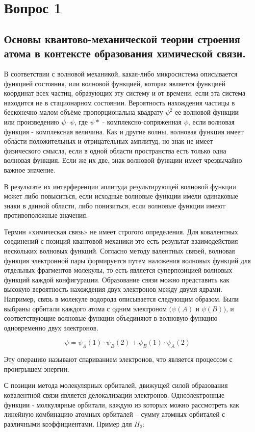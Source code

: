 \documentclass[14pt,a4paper]{scrartcl}
\begin{document}
\section{Вопрос 1}
\subsection{\textbf{Основы квантово-механической теории строения атома в контексте образования химической связи.}}

 В соответствии с волновой механикой, какая-либо микросистема
описывается функцией состояния, или волновой функцией, которая
является функцией координат всех частиц, образующих эту систему
и от времени, если эта система находится не в стационарном
состоянии. Вероятность нахождения частицы в бесконечно малом
объёме пропорциональна квадрату $\psi^2$ ее волновой функции или
произведению $\psi\cdot\psi$, где $\psi*$ - комплексно-сопряженная $\psi$, если
волновая функция - комплексная величина. Как и другие волны,
волновая функция имеет области положительных и отрицательных
амплитуд, но знак не имеет физического смысла, если в одной
области пространства есть только одна волновая функция. Если же
их две, знак волновой функции имеет чрезвычайно важное
значение.

В результате их интерференции аплитуда
результирующей волновой функции может либо повыситься, если
исходные волновые функции имели одинаковые знаки в данной
области, либо понизиться, если волновые функции имеют
противоположные значения.

Термин «химическая связь» не имеет строгого определения. Для
ковалентных соединений с позиций квантовой механики это есть
результат взаимодействия нескольких волновых функций. Согласно
методу валентных связей, волновая функция электронной пары
формируется путем наложения волновых функций для отдельных
фрагментов молекулы, то есть является суперпозицией волновых
функций каждой конфигурации. Образование связи можно
представить как высокую вероятность нахождения двух электронов
между двумя ядрами. Например, связь в молекуле водорода
описывается следующим образом. Были выбраны орбитали
каждого атома с одним электроном $(\psi(A)$ и $\psi(B))$, и
соответствующие волновые функции объединяют в волновую
функцию одновременно двух электронов.

$$\psi = \psi_A(1)\cdot\psi_B(2) + \psi_B(1)\cdot\psi_A(2)$$

Эту операцию называют спариванием электронов, что является процессом с проигрышем энергии.

С позиции метода молекулярных орбиталей, движущей силой образования ковалентной связи является делокализации электронов. Одноэлектронные функции - молкулярные орбитали, каждую из которых можно рассмотреть как линейную комбинацию атомных орбиталей -- сумму атомных орбиталей с различными коэффициентами. Пример для $H_2$:
\end{document}
